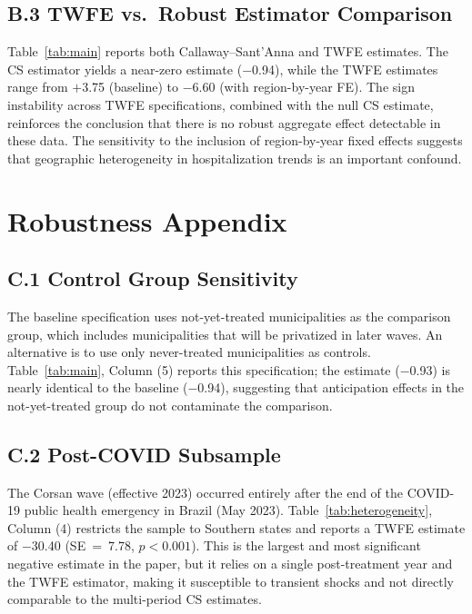 \documentclass[12pt]{article}
\begin{document}
\subsection*{B.3 TWFE vs.\ Robust Estimator Comparison}

Table~\ref{tab:main} reports both Callaway--Sant'Anna and TWFE estimates. The CS estimator yields a near-zero estimate ($-$0.94), while the TWFE estimates range from $+$3.75 (baseline) to $-$6.60 (with region-by-year FE). The sign instability across TWFE specifications, combined with the null CS estimate, reinforces the conclusion that there is no robust aggregate effect detectable in these data. The sensitivity to the inclusion of region-by-year fixed effects suggests that geographic heterogeneity in hospitalization trends is an important confound.

\section{Robustness Appendix}
\label{app:robustness}

\subsection*{C.1 Control Group Sensitivity}

The baseline specification uses not-yet-treated municipalities as the comparison group, which includes municipalities that will be privatized in later waves. An alternative is to use only never-treated municipalities as controls. Table~\ref{tab:main}, Column (5) reports this specification; the estimate ($-$0.93) is nearly identical to the baseline ($-$0.94), suggesting that anticipation effects in the not-yet-treated group do not contaminate the comparison.

\subsection*{C.2 Post-COVID Subsample}

The Corsan wave (effective 2023) occurred entirely after the end of the COVID-19 public health emergency in Brazil (May 2023). Table~\ref{tab:heterogeneity}, Column (4) restricts the sample to Southern states and reports a TWFE estimate of $-$30.40 (SE~=~7.78, $p<0.001$). This is the largest and most significant negative estimate in the paper, but it relies on a single post-treatment year and the TWFE estimator, making it susceptible to transient shocks and not directly comparable to the multi-period CS estimates.
\end{document}
